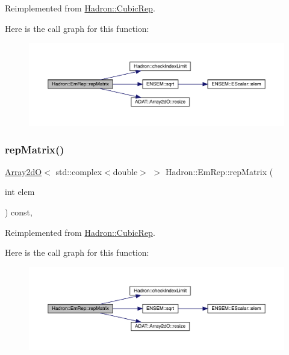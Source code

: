 Reimplemented from \mbox{\hyperlink{structHadron_1_1CubicRep_ac5d7e9e6f4ab1158b5fce3e4ad9e8005}{Hadron\+::\+Cubic\+Rep}}.

Here is the call graph for this function\+:
\nopagebreak
\begin{figure}[H]
\begin{center}
\leavevmode
\includegraphics[width=350pt]{d6/d4b/structHadron_1_1EmRep_a8c91198aaf2473fd63a22c16ed7415f2_cgraph}
\end{center}
\end{figure}
\mbox{\label{structHadron_1_1EmRep_a8c91198aaf2473fd63a22c16ed7415f2}} 
\subsubsection{\texorpdfstring{repMatrix()}{repMatrix()}\hspace{0.1cm}{\footnotesize\ttfamily [3/3]}}
{\footnotesize\ttfamily \mbox{\hyperlink{classADAT_1_1Array2dO}{Array2dO}}$<$ std\+::complex$<$double$>$ $>$ Hadron\+::\+Em\+Rep\+::rep\+Matrix (\begin{DoxyParamCaption}\item[{int}]{elem }\end{DoxyParamCaption}) const\hspace{0.3cm}{\ttfamily [inline]}, {\ttfamily [virtual]}}



Reimplemented from \mbox{\hyperlink{structHadron_1_1CubicRep_ac5d7e9e6f4ab1158b5fce3e4ad9e8005}{Hadron\+::\+Cubic\+Rep}}.

Here is the call graph for this function\+:
\nopagebreak
\begin{figure}[H]
\begin{center}
\leavevmode
\includegraphics[width=350pt]{d6/d4b/structHadron_1_1EmRep_a8c91198aaf2473fd63a22c16ed7415f2_cgraph}
\end{center}
\end{figure}


